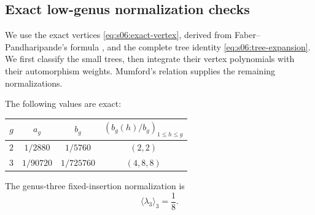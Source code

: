 \subsection{Exact low-genus normalization checks}
\label{subsec:c:01}

We use the exact vertices \eqref{eq:s06:exact-vertex}, derived from
Faber--Pandharipande's formula \cite[Theorem 1]{FP03}, and the
complete tree identity \eqref{eq:s06:tree-expansion}. We first
classify the small trees, then integrate their vertex polynomials
with their automorphism weights. Mumford's relation
\cite[\S 5]{Mum83} supplies the remaining normalizations.

\begin{prp}\label{prp:c:low-genus}
The following values are exact:
\begin{center}
\begin{tabular}{c|c|c|c}
$g$ & $a_g$ & $b_g$ & $(b_g(h)/b_g)_{1\leq h\leq g}$\\
\hline
$2$ & $1/2880$ & $1/5760$ & $(2,2)$\\
$3$ & $1/90720$ & $1/725760$ & $(4,8,8)$
\end{tabular}
\end{center}
The genus-three fixed-insertion normalization is
\begin{equation}\label{eq:c:lambda-three}
 \langle\lambda_3\rangle_3=\frac18.
\end{equation}
\end{prp}
